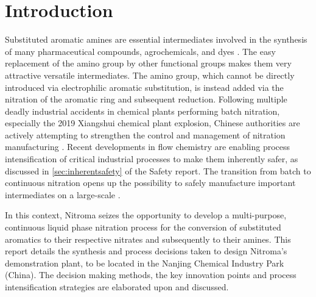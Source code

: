 \section{Introduction} %

Substituted aromatic amines are essential intermediates involved in the synthesis of many pharmaceutical compounds, agrochemicals, and dyes \cite{vogt_amines_2000}. The easy replacement of the amino group by other functional groups makes them very attractive versatile intermediates. The amino group, which cannot be directly introduced via electrophilic aromatic substitution, is instead added via the nitration of the aromatic ring and subsequent reduction.
Following multiple deadly industrial accidents in chemical plants performing batch nitration, especially the 2019 Xiangshui chemical plant explosion, Chinese authorities are actively attempting to strengthen the control and management of nitration manufacturing \cite{el_diario_china_2019}.
Recent developments in flow chemistry are enabling process intensification of critical industrial processes to make them inherently safer, as discussed in \cref{sec:inherentsafety} of the Safety report. The transition from batch to continuous nitration opens up the possibility to safely manufacture important intermediates on a large-scale \cite{di_miceli_raimondi_safety_2015}.

In this context, Nitroma seizes the opportunity to develop a multi-purpose, continuous liquid phase nitration process for the conversion of substituted aromatics to their respective nitrates and subsequently to their amines.
This report details the synthesis and process decisions taken to design Nitroma’s demonstration plant, to be located in the Nanjing Chemical Industry Park (China). The decision making methods, the key innovation points and process intensification strategies are elaborated upon and discussed.

